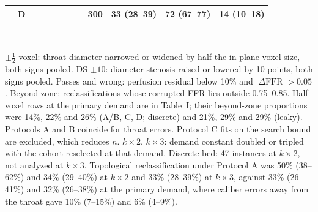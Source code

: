 \documentclass[journal,twoside,web,onecolumn]{ieeecolor}
\begin{document}
\begin{table}[!ht]
\begin{tabular}{@{}llrccc rccc@{}}
 & D & -- & -- & -- & -- & 300 & 33 (28--39) & 72 (67--77) & 14 (10--18) \\
\bottomrule
\end{tabular}
\\[3pt]
\parbox{0.95\textwidth}{\footnotesize $\pm\tfrac12$ voxel: throat diameter narrowed or widened by half the in-plane voxel size, both signs pooled. DS $\pm10$: diameter stenosis raised or lowered by 10 points, both signs pooled. Passes and wrong: perfusion residual below 10\% and $|\Delta\mathrm{FFR}| > 0.05$. Beyond zone: reclassifications whose corrupted FFR lies outside 0.75--0.85. Half-voxel rows at the primary demand are in Table~I; their beyond-zone proportions were 14\%, 22\% and 26\% (A/B, C, D; discrete) and 21\%, 29\% and 29\% (leaky). Protocols A and B coincide for throat errors. Protocol C fits on the search bound are excluded, which reduces $n$. $k\times2$, $k\times3$: demand constant doubled or tripled with the cohort reselected at that demand. Discrete bed: 47 instances at $k\times2$, not analyzed at $k\times3$. Topological reclassification under Protocol A was 50\% (38--62\%) and 34\% (29--40\%) at $k\times2$ and 33\% (28--39\%) at $k\times3$, against 33\% (26--41\%) and 32\% (26--38\%) at the primary demand, where caliber errors away from the throat gave 10\% (7--15\%) and 6\% (4--9\%).}
\end{table}

\FloatBarrier
{}
\end{document}
